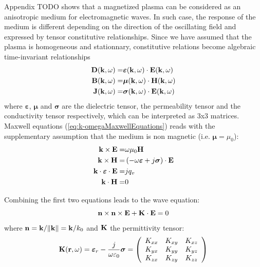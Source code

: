 Appendix TODO shows that a magnetized plasma can be considered as an anisotropic medium for electromagnetic waves.  In such case, the response of the medium is different depending on the direction of the oscillating field and expressed by tensor constitutive relationships. Since we have assumed that the plasma is homogeneous and stationnary, constitutive relations become algebraic time-invariant relationships%
\begin{subequations}
	\begin{align}
		{\mathbf D}({\mathbf k}, \omega) 
		=& 
		\boldsymbol{\varepsilon}({\mathbf k}, \omega) \cdot {\mathbf E}({\mathbf k}, \omega) 
		\label{eq:disp_relation_kw_D}
		\\
		{\mathbf B}({\mathbf k}, \omega) 
		=& 
		\boldsymbol{\mu}({\mathbf k}, \omega) \cdot {\mathbf H}({\mathbf k}, \omega) 
		\label{eq:disp_relation_kw_B}
		\\
		{\mathbf J}({\mathbf k}, \omega) 
		=& 
		\boldsymbol{\sigma}({\mathbf k}, \omega) \cdot {\mathbf E}({\mathbf k}, \omega) 
		\label{eq:disp_relation_kw_J}
	\end{align}
	\label{eq:k-omegaDispersionRelation}
\end{subequations}
where $\boldsymbol{\varepsilon}$, $\boldsymbol{\mu}$ and $\boldsymbol{\sigma}$ are the dielectric tensor, the permeability tensor and the conductivity tensor respectively, which can be interpreted as 3x3 matrices. Maxwell equations (\ref{eq:k-omegaMaxwellEquations}) reads with the supplementary assumption that the medium is non magnetic (i.e. $\boldsymbol{\mu}=\mu_0$):
\begin{subequations}
	\begin{align}
		{\mathbf k} \times {\mathbf E}  
		=& 
		\omega \mu_0 {\mathbf H}
		\\
		{\mathbf k} \times {\mathbf H} 
		=& 
		\left(
		-\omega \boldsymbol{\varepsilon} 
		+ 	
		j\boldsymbol{\sigma} 
		\right) \cdot 
		{\mathbf E}
		\\
		{\mathbf k}  \cdot \boldsymbol{\varepsilon}  \cdot {\mathbf E} 
		=& jq_v
		\\
		{\mathbf k}  \cdot {\mathbf H} 
		=& 0	
	\end{align}
\end{subequations}

Combining the first two equations leads to the wave equation:
\begin{equation}
{\mathbf n} \times {\mathbf n} \times {\mathbf E} + {\mathbf K} \cdot {\mathbf E} = 0
\end{equation}
where ${\mathbf n} = {\mathbf k} / \norm{{\mathbf k}} = {\mathbf k}/k_0$ and ${\mathbf K}$ the permittivity tensor:
\begin{equation}
{\mathbf K}({\mathbf r}, \omega) =  
\boldsymbol{\varepsilon}_r - \frac{j}{\omega \varepsilon_0} \boldsymbol{\sigma}
=
\left(
\begin{array}{ccc}
K_{xx} & K_{xy} & K_{xz} \\
K_{yx} & K_{yy} & K_{yz} \\
K_{zx} & K_{zy} & K_{zz} \\
\end{array}
\right)
\end{equation}  


